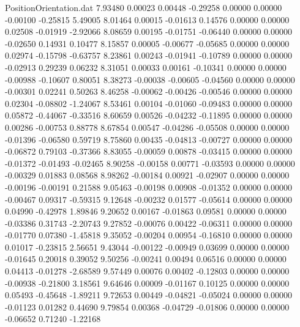 \begin{filecontents}{PositionOrientation.dat}
   7.93480    0.00023    0.00448    -0.29258    0.00000    0.00000   -0.00100   -0.25815    5.49005
   8.01464    0.00015   -0.01613     0.14576    0.00000    0.00000    0.02508   -0.01919   -2.92066
   8.08659    0.00195   -0.01751    -0.06440    0.00000    0.00000   -0.02650    0.14931    0.10477
   8.15857    0.00005   -0.00677    -0.05685    0.00000    0.00000    0.02974   -0.15798   -0.63757
   8.23861    0.00243   -0.01941    -0.10789    0.00000    0.00000   -0.02913    0.29239    0.06232
   8.31051    0.00033    0.00161    -0.10341    0.00000    0.00000   -0.00988   -0.10607    0.80051
   8.38273   -0.00038   -0.00605    -0.04560    0.00000    0.00000   -0.00301    0.02241    0.50263
   8.46258   -0.00062   -0.00426    -0.00546    0.00000    0.00000    0.02304   -0.08802   -1.24067
   8.53461    0.00104   -0.01060    -0.09483    0.00000    0.00000    0.05872   -0.44067   -0.33516
   8.60659    0.00526   -0.04232    -0.11895    0.00000    0.00000    0.00286   -0.00753    0.88778
   8.67854    0.00547   -0.04286    -0.05508    0.00000    0.00000   -0.01396   -0.06580    0.59719
   8.75860    0.00435   -0.04813    -0.00727    0.00000    0.00000   -0.06872    0.79103   -0.37366
   8.83055   -0.00059    0.00878    -0.03415    0.00000    0.00000   -0.01372   -0.01493   -0.02465
   8.90258   -0.00158    0.00771    -0.03593    0.00000    0.00000   -0.00329    0.01883    0.08568
   8.98262   -0.00184    0.00921    -0.02907    0.00000    0.00000   -0.00196   -0.00191    0.21588
   9.05463   -0.00198    0.00908    -0.01352    0.00000    0.00000   -0.00467    0.09317   -0.59315
   9.12648   -0.00232    0.01577    -0.05614    0.00000    0.00000    0.04990   -0.42978    1.89846
   9.20652    0.00167   -0.01863     0.09581    0.00000    0.00000   -0.03386    0.31743   -2.20743
   9.27852   -0.00076    0.00422    -0.06311    0.00000    0.00000   -0.01770    0.07380   -1.45818
   9.35052   -0.00204    0.00954    -0.16810    0.00000    0.00000    0.01017   -0.23815    2.56651
   9.43044   -0.00122   -0.00949     0.03699    0.00000    0.00000   -0.01645    0.20018    0.39052
   9.50256   -0.00241    0.00494     0.06516    0.00000    0.00000    0.04413   -0.01278   -2.68589
   9.57449    0.00076    0.00402    -0.12803    0.00000    0.00000   -0.00938   -0.21800    3.18561
   9.64646    0.00009   -0.01167     0.10125    0.00000    0.00000    0.05493   -0.45648   -1.89211
   9.72653    0.00449   -0.04821    -0.05024    0.00000    0.00000   -0.01123    0.01282    0.44690
   9.79854    0.00368   -0.04729    -0.01806    0.00000    0.00000   -0.06652    0.71240   -1.22168

\end{filecontents}
